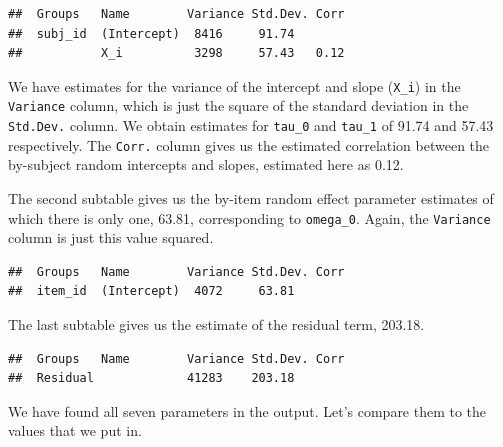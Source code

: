 \documentclass[english,doc,floatsintext]{apa6}
\begin{document}
\begin{verbatim}
##  Groups   Name        Variance Std.Dev. Corr
##  subj_id  (Intercept)  8416     91.74       
##           X_i          3298     57.43   0.12
\end{verbatim}

\noindent We have estimates for the variance of the intercept and slope (\texttt{X\_i}) in the \texttt{Variance} column, which is just the square of the standard deviation in the \texttt{Std.Dev.} column. We obtain estimates for \texttt{tau\_0} and \texttt{tau\_1} of 91.74 and 57.43 respectively. The \texttt{Corr.} column gives us the estimated correlation between the by-subject random intercepts and slopes, estimated here as 0.12.

The second subtable gives us the by-item random effect parameter estimates of which there is only one, 63.81, corresponding to \texttt{omega\_0}. Again, the \texttt{Variance} column is just this value squared.

\begin{verbatim}
##  Groups   Name        Variance Std.Dev. Corr
##  item_id  (Intercept)  4072     63.81
\end{verbatim}

The last subtable gives us the estimate of the residual term, 203.18.

\begin{verbatim}
##  Groups   Name        Variance Std.Dev. Corr
##  Residual             41283    203.18
\end{verbatim}

We have found all seven parameters in the output. Let's compare them to the values that we put in.
\end{document}
